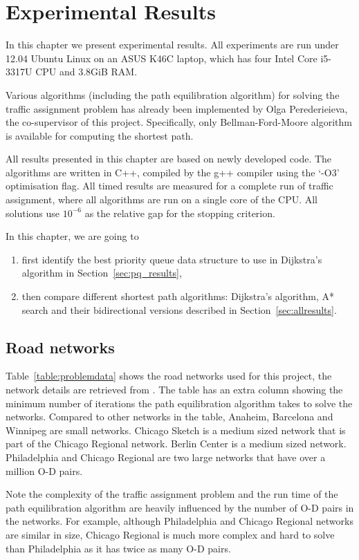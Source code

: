 \chapter{Experimental Results}\label{chap:results}
In this chapter we present experimental results.
All experiments are run under 12.04 Ubuntu Linux on an ASUS K46C laptop,
which has four Intel Core i5-3317U CPU and 3.8GiB RAM.

Various algorithms (including the path equilibration algorithm) for solving
the traffic assignment problem has already been implemented by Olga Perederieieva, the co-supervisor of this project.
Specifically, only Bellman-Ford-Moore algorithm is available for computing the shortest path. 

All results presented in this chapter are based on newly developed code.
The algorithms are written in C++, compiled by the g++ compiler using the `-O3' optimisation flag.
All timed results are measured for a complete run of traffic assignment,
where all algorithms are run on a single core of the CPU.
All solutions use $10^{-6}$ as the relative gap for the stopping criterion.

In this chapter, we are going to
\begin{enumerate}
    \item first identify the best priority queue data structure to use in Dijkstra's algorithm in Section~\ref{sec:pq_results},
    \item then compare different shortest path algorithms: Dijkstra's algorithm, A* search and their bidirectional versions described in Section~\ref{sec:allresults}.
\end{enumerate}

\section{Road networks}
Table~\ref{table:problemdata} shows the road networks used for this project, the network details are retrieved from \citet{ProblemData}.
The table has an extra column showing the minimum number of iterations the path equilibration algorithm takes to solve the networks.
Compared to other networks in the table,
Anaheim, Barcelona and Winnipeg are small networks.
Chicago Sketch is a medium sized network that is part of the Chicago Regional network.
Berlin Center is a medium sized network.
Philadelphia and Chicago Regional are two large networks that have over a million O-D pairs.

Note the complexity of the traffic assignment problem and the run time of the path equilibration algorithm are heavily influenced by the number of O-D pairs in the networks.
For example, although Philadelphia and Chicago Regional networks are similar in size,
Chicago Regional is much more complex and hard to solve than Philadelphia as it has twice as many O-D pairs.

